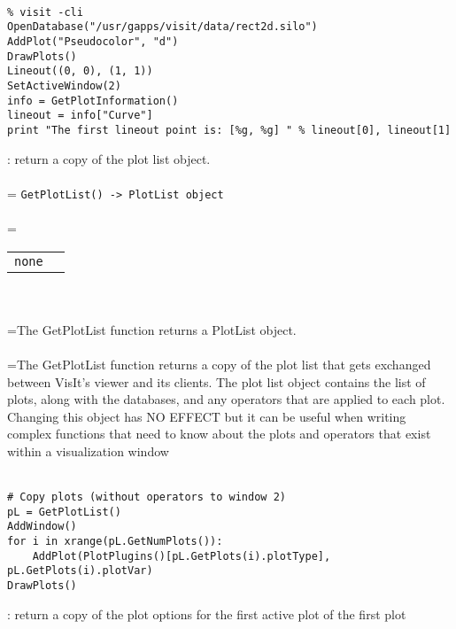 \documentclass[10pt,a4paper]{report}
\begin{document}
\\[-6mm]
\begin{verbatim}% visit -cli
OpenDatabase("/usr/gapps/visit/data/rect2d.silo")
AddPlot("Pseudocolor", "d")
DrawPlots()
Lineout((0, 0), (1, 1))
SetActiveWindow(2)
info = GetPlotInformation()
lineout = info["Curve"]
print "The first lineout point is: [%g, %g] " % lineout[0], lineout[1]
\end{verbatim}
\newpage


{}
: return a copy of the plot list object.\\[-3mm]

 \\ 
\hangindent=\parindent 
\verb!GetPlotList() -> PlotList object!\\ [-3mm]

 \\ 
\hangindent=\parindent 
\begin{tabular}{ll}
\verb!none! &  \\
\end{tabular} \\[-2mm]


 \\ 
\hangindent=\parindent The GetPlotList function returns a PlotList object. \\[-3mm] 

 \\ 
\hangindent=\parindent The GetPlotList function returns a copy of the plot list that gets exchanged between VisIt's viewer and its clients. The plot list object contains the list of plots, along with the databases, and any operators that are applied to each plot. Changing this object has NO EFFECT but it can be useful when writing complex functions that need to know about the plots and operators that exist within a visualization window \\[-3mm] 

\\[-6mm]
\begin{verbatim}# Copy plots (without operators to window 2)
pL = GetPlotList()
AddWindow()
for i in xrange(pL.GetNumPlots()):
    AddPlot(PlotPlugins()[pL.GetPlots(i).plotType], pL.GetPlots(i).plotVar)
DrawPlots()
\end{verbatim}
\newpage


{}
: return a copy of the plot options for the first active plot of the first plot\\[-3mm]
\end{document}
